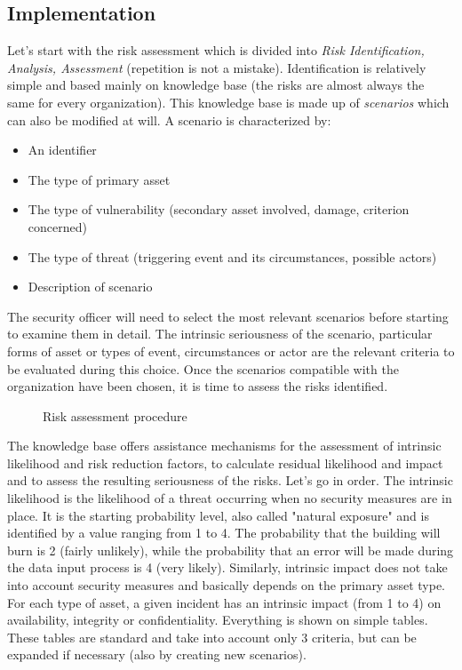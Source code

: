 \subsection{Implementation}
Let's start with the risk assessment which is divided into \textit{Risk Identification, Analysis, Assessment} (repetition is not a mistake). Identification is relatively simple and based mainly on knowledge base (the risks are almost always the same for every organization). This knowledge base is made up of \textit{scenarios} which can also be modified at will. A scenario is characterized by:
\begin{itemize}
    \itemsep0em
    \item An identifier
    \item The type of primary asset
    \item The type of vulnerability (secondary asset involved, damage, criterion concerned)
    \item The type of threat (triggering event and its circumstances, possible actors)
    \item Description of scenario
\end{itemize}
The security officer will need to select the most relevant scenarios before starting to examine them in detail. The intrinsic seriousness of the scenario, particular forms of asset or types of event, circumstances or actor are the relevant criteria to be evaluated during this choice. Once the scenarios compatible with the organization have been chosen, it is time to assess the risks identified.
\begin{figure}[H]
  \centering
  
  \caption{Risk assessment procedure}
\end{figure}
\noindent
The knowledge base offers assistance mechanisms for the assessment of intrinsic likelihood and risk reduction factors, to calculate residual likelihood and impact and to assess the resulting seriousness of the risks. Let's go in order.\newline
The intrinsic likelihood is the likelihood of a threat occurring when no security measures are in place. It is the starting probability level, also called "natural exposure" and is identified by a value ranging from 1 to 4. The probability that the building will burn is 2 (fairly unlikely), while the probability that an error will be made during the data input process is 4 (very likely). Similarly, intrinsic impact does not take into account security measures and basically depends on the primary asset type. For each type of asset, a given incident has an intrinsic impact (from 1 to 4) on availability, integrity or confidentiality. Everything is shown on simple tables. These tables are standard and take into account only 3 criteria, but can be expanded if necessary (also by creating new scenarios).\newline
